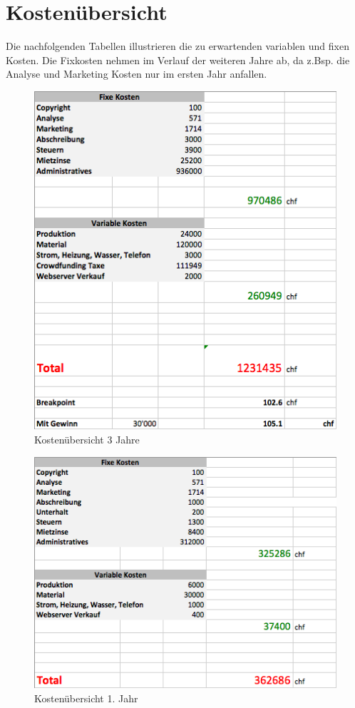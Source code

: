 \section{Kosten\"ubersicht}
Die nachfolgenden Tabellen illustrieren die zu erwartenden variablen und fixen Kosten. Die Fixkosten nehmen im Verlauf der weiteren Jahre ab, da z.Bsp. die Analyse und Marketing Kosten nur im ersten Jahr anfallen.
\begin{figure}[H]
	\centering
		\includegraphics[scale=0.6]{bilder/3Jahre.png}
	\caption{Kosten\"ubersicht 3 Jahre}
	\label{fig:3Jahre}
\end{figure}
\begin{figure}[H]
	\centering
		\includegraphics[scale=0.6]{bilder/Jahr1.png}
	\caption{Kosten\"ubersicht 1. Jahr}
	\label{fig:Jahr1}
\end{figure}
